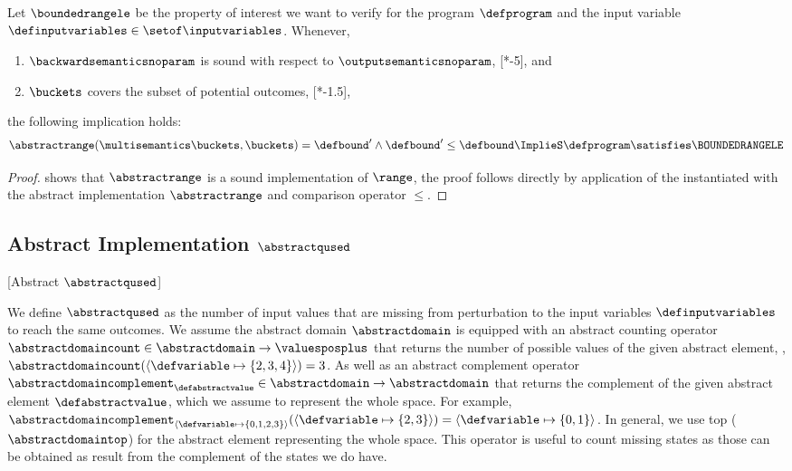 \begin{theorem} 
  Let $\boundedrangele$ be the property of interest we want to verify for the program $\defprogram$ and the input variable $\definputvariables\in\setof\inputvariables$.
  Whenever,
  \begin{enumerate}[label=(\roman*)]
    \item $\backwardsemanticsnoparam$ is sound with respect to $\outputsemanticsnoparam$, \cf{} [*-5], and
    \item $\buckets$ covers the subset of potential outcomes, \cf{} [*-1.5],
\end{enumerate}
  the following implication holds:
  \begin{align*}
    \abstractrange(\multisemantics\buckets, \buckets) = \defbound' \land \defbound' \le \defbound \ImplieS \defprogram \satisfies \BOUNDEDRANGELE
  \end{align*}
\end{theorem}
\begin{proof}
   shows that $\abstractrange$ is a sound implementation of $\range$, the proof follows directly by application of the  instantiated with the abstract implementation $\abstractrange$ and comparison operator $\le$.
\end{proof}

\subsection{Abstract Implementation \texorpdfstring{$\abstractqused$}{Abstract QUsed}}[Abstract \texorpdfstring{$\abstractqused$}{QUsed}]

We define $\abstractqused$ as the number of input values that are missing from perturbation to the input variables $\definputvariables$ to reach the same outcomes. We assume the abstract domain $\abstractdomain$ is equipped with an abstract counting operator $\abstractdomaincount\in\abstractdomain\to\valuesposplus$ that returns the number of possible values of the given abstract element, \eg, $\abstractdomaincount(\langle \defvariable \mapsto \{2, 3, 4\}\rangle) = 3$.
As well as an abstract complement operator $\abstractdomaincomplement_{\defabstractvalue}\in\abstractdomain\to\abstractdomain$ that returns the complement of the given abstract element \wrt{} $\defabstractvalue$, which we assume to represent the whole space.
For example, $\abstractdomaincomplement_{\langle \defvariable \mapsto \{0, 1, 2, 3\}\rangle}(\langle \defvariable \mapsto \{2, 3\}\rangle) = \langle \defvariable \mapsto \{0, 1\} \rangle$.
In general, we use top ($\abstractdomaintop$) for the abstract element representing the whole space.
This operator is useful to count missing states as those can be obtained as result from the complement of the states we do have.

